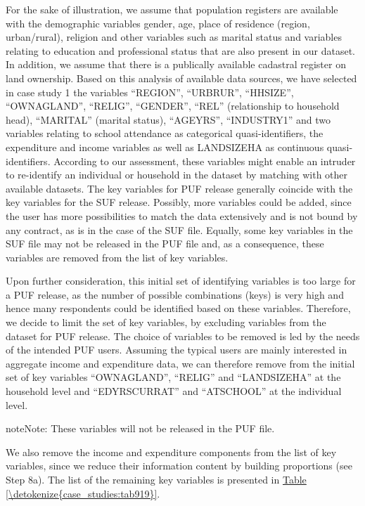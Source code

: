 \documentclass[letterpaper,10pt,english]{sphinxmanual}
\begin{document}
For the sake of illustration, we assume that population registers are
available with the demographic variables gender, age, place of residence
(region, urban/rural), religion and other variables such as marital
status and variables relating to education and professional status that
are also present in our dataset. In addition, we assume that there is a
publically available cadastral register on land ownership. Based on this
analysis of available data sources, we have selected in case study 1 the
variables “REGION”, “URBRUR”, “HHSIZE”, “OWNAGLAND”, “RELIG”, “GENDER”,
“REL” (relationship to household head), “MARITAL” (marital status),
“AGEYRS”, “INDUSTRY1” and two variables relating to school attendance as
categorical quasi-identifiers, the expenditure and income variables as
well as LANDSIZEHA as continuous quasi-identifiers. According to our
assessment, these variables might enable an intruder to re-identify an
individual or household in the dataset by matching with other available
datasets. The key variables for PUF release generally coincide with the
key variables for the SUF release. Possibly, more variables could be
added, since the user has more possibilities to match the data
extensively and is not bound by any contract, as is in the case of the
SUF file. Equally, some key variables in the SUF file may not be
released in the PUF file and, as a consequence, these variables are
removed from the list of key variables.

Upon further consideration, this initial set of identifying variables is
too large for a PUF release, as the number of possible combinations
(keys) is very high and hence many respondents could be identified based
on these variables. Therefore, we decide to limit the set of key
variables, by excluding variables from the dataset for PUF release. The
choice of variables to be removed is led by the needs of the intended
PUF users. Assuming the typical users are mainly interested in aggregate
income and expenditure data, we can therefore remove from the initial
set of key variables “OWNAGLAND”, “RELIG” and “LANDSIZEHA” at the
household level and “EDYRSCURRAT” and “ATSCHOOL” at the individual
level.

\begin{sphinxadmonition}{note}{Note:}
These variables will not be released in the PUF file.
\end{sphinxadmonition}

We also remove the income and expenditure components from the list of
key variables, since we reduce their information content by building
proportions (see Step 8a). The list of the remaining key variables is
presented in \hyperref[\detokenize{case_studies:tab919}]{Table \ref{\detokenize{case_studies:tab919}}}.
\end{document}
